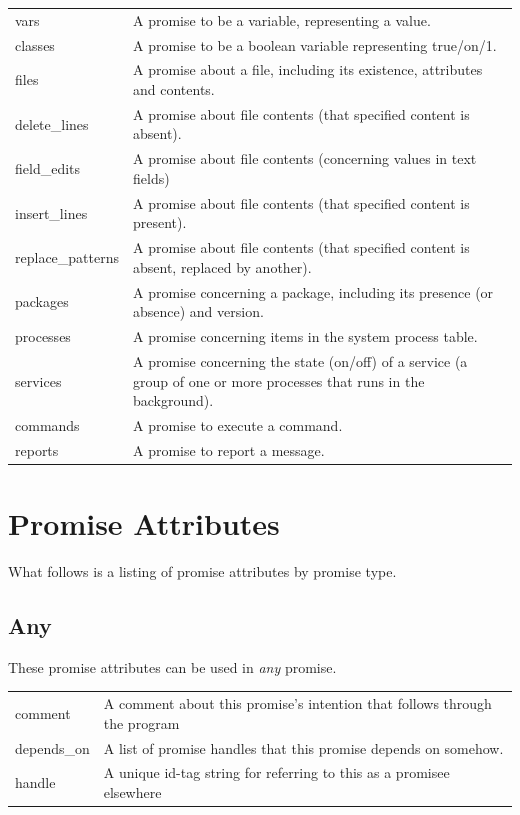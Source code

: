 \begin{longtable}{|l|l|}
\hline
vars & A promise to be a variable, representing a value.\\
classes & A promise to be a boolean variable representing true/on/1.\\
files & A promise about a file, including its existence, attributes and contents.\\
delete\_lines & A promise about file contents (that specified content is absent).\\
field\_edits & A promise about file contents (concerning values in text fields)\\
insert\_lines & A promise about file contents (that specified content is present).\\
replace\_patterns & A promise about file contents (that specified content is absent, replaced by another).\\
packages & A promise concerning a package, including its presence (or absence) and version.\\
processes & A promise concerning items in the system process table.\\
services & A promise concerning the state (on/off) of a service (a group of one or more processes that runs in the background).\\
commands & A promise to execute a command.\\
reports & A promise to report a message.\\
\hline
\end{longtable}

\section{Promise Attributes}

What follows is a listing of promise attributes by promise type.

\subsection{Any}

These promise attributes can be used in \emph{any} promise.

\begin{longtable}{|l|l|}
\hline
comment & A comment about this promise's intention that follows through the program\\
depends\_on & A list of promise handles that this promise depends on somehow.\\
handle & A unique id-tag string for referring to this as a promisee elsewhere\\
\hline
\end{longtable}

